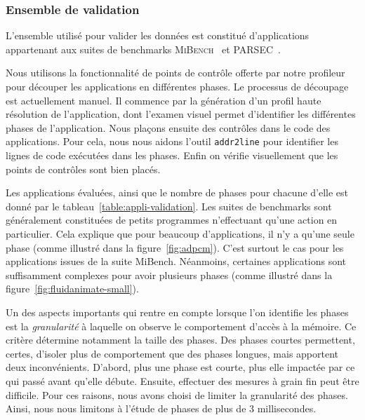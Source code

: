 \subsubsection{Ensemble de validation}

L'ensemble utilisé pour valider les données est constitué d'applications appartenant aux suites de benchmarks \textsc{MiBench}~\cite{guthaus2001mibench} et \textsc{PARSEC}~\cite{bienia2008parsec}.

Nous utilisons la fonctionnalité de points de contrôle offerte par notre profileur pour découper les applications en différentes phases.
Le processus de découpage est actuellement manuel.
Il commence par la génération d'un profil haute résolution de l'application, dont l'examen visuel permet d'identifier les différentes phases de l'application.
Nous plaçons ensuite des contrôles dans le code des applications.
Pour cela, nous nous aidons l'outil \texttt{addr2line} pour identifier les lignes de code exécutées dans les phases.
Enfin on vérifie visuellement que les points de contrôles sont bien placés.

Les applications évaluées, ainsi que le nombre de phases pour chacune d'elle est donné par le tableau~\ref{table:appli-validation}.
Les suites de benchmarks sont généralement constituées de petits programmes n'effectuant qu'une action en particulier.
Cela explique que pour beaucoup d'applications, il n'y a qu'une seule phase (comme illustré dans la figure~\ref{fig:adpcm}).
C'est surtout le cas pour les applications issues de la suite MiBench.
Néanmoins, certaines applications sont suffisamment complexes pour avoir plusieurs phases (comme illustré dans la figure~\ref{fig:fluidanimate-small}).

Un des aspects importants qui rentre en compte lorsque l'on identifie les phases est la \emph{granularité} à laquelle on observe le comportement d'accès à la mémoire.
Ce critère détermine notamment la taille des phases.
Des phases courtes permettent, certes, d'isoler plus de comportement que des phases longues, mais apportent deux inconvénients.
D'abord, plus une phase est courte, plus elle impactée par ce qui passé avant qu'elle débute.
Ensuite, effectuer des mesures à grain fin peut être difficile. 
Pour ces raisons, nous avons choisi de limiter la granularité des phases.
Ainsi, nous nous limitons à l'étude de phases de plus de 3 millisecondes.

